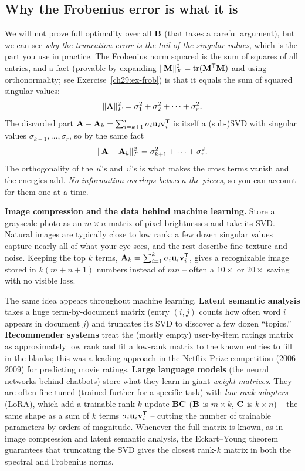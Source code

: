 \subsection{Why the Frobenius error is what it is}

We will not prove full optimality over all $\mathbf{B}$ (that takes a careful
argument), but we can see \emph{why the truncation error is the tail of the
singular values}, which is the part you use in practice. The Frobenius norm
squared is the sum of squares of all entries, and a fact (provable by
expanding $\lVert\mathbf{M}\rVert_F^2 = \operatorname{tr}(\mathbf{M}^{\mathsf{T}}\mathbf{M})$ and using orthonormality;
see Exercise~\ref{ch29:ex-frob})
is that it equals the sum of squared singular values:
\[
  \lVert\mathbf{A}\rVert_F^2 = \sigma_1^2 + \sigma_2^2 + \cdots + \sigma_r^2.
\]
The discarded part $\mathbf{A} - \mathbf{A}_k = \sum_{i=k+1}^r \sigma_i\mathbf{u}_i\mathbf{v}_i^{\mathsf{T}}$
is itself a (sub-)SVD with singular values $\sigma_{k+1},\dots,\sigma_r$, so by
the same fact
\[
  \lVert\mathbf{A} - \mathbf{A}_k\rVert_F^2 = \sigma_{k+1}^2 + \cdots + \sigma_r^2.
\]
The orthogonality of the $\vec{u}$'s and $\vec{v}$'s is what makes the cross terms
vanish and the energies add. \emph{No information overlaps between the
pieces}, so you can account for them one at a time.

\begin{applicationbox}
\textbf{Image compression and the data behind machine learning.} Store a
grayscale photo as an $m\times n$ matrix of pixel brightnesses and take its SVD.
Natural images are typically close to low rank: a few dozen singular values capture nearly
all of what your eye sees, and the rest describe fine texture and noise. Keeping the
top $k$ terms, $\mathbf{A}_k = \sum_{i=1}^k \sigma_i\mathbf{u}_i\mathbf{v}_i^{\mathsf{T}}$, gives a
recognizable image stored in $k(m+n+1)$ numbers instead of $mn$ -- often a $10\times$
or $20\times$ saving with no visible loss.

The same idea appears throughout machine learning. \textbf{Latent semantic analysis} takes a
huge term-by-document matrix (entry $(i,j)$ counts how often word $i$ appears in
document $j$) and truncates its SVD to discover a few dozen
``topics.'' \textbf{Recommender systems} treat the (mostly empty) user-by-item
ratings matrix as approximately low rank and fit a low-rank matrix to the known
entries to fill in the blanks; this was a leading approach in the Netflix Prize
competition (2006--2009) for predicting movie ratings. \textbf{Large language
models} (the neural networks behind chatbots) store what they learn in giant
\emph{weight matrices}. They are often fine-tuned (trained further for a specific
task) with \emph{low-rank adapters} (LoRA), which
add a trainable rank-$k$ update $\mathbf{B}\mathbf{C}$ ($\mathbf{B}$ is $m\times k$, $\mathbf{C}$
is $k\times n$) -- the same shape as a sum of $k$ terms
$\sigma_i \mathbf{u}_i\mathbf{v}_i^{\mathsf{T}}$ -- cutting the
number of trainable parameters by orders of magnitude. Whenever the full matrix
is known, as in image compression and latent semantic analysis, the
Eckart--Young theorem guarantees that truncating the SVD gives the closest
rank-$k$ matrix in both the spectral and Frobenius norms.
\end{applicationbox}

